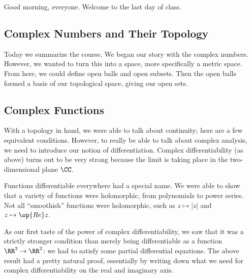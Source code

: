 
Good morning, everyone. Welcome to the last day of class.

\subsection{Complex Numbers and Their Topology}
Today we summarize the course. We began our story with the complex numbers.
\complexdefiagain*
\noindent However, we wanted to turn this into a space, more specifically a metric space.
\complexdistdefi*
\noindent From here, we could define open balls and open subsets.
\openballdefi*
\noindent Then the open balls formed a basis of our topological space, giving our open sets.
\opendefi*

\subsection{Complex Functions}
With a topology in hand, we were able to talk about continuity; here are a few equivalent conditions.
\continuitygrabbag*
\noindent However, to really be able to talk about complex analysis, we need to introduce our notion of differentiation.
\complexdiffdefi*
\noindent Complex differentiability (as above) turns out to be very strong because the limit is taking place in the two-dimensional plane $\CC$.

Functions differentiable everywhere had a special name.
\holodefi*
\noindent We were able to show that a variety of functions were holomorphic, from polynomials to power series. Not all ``smoothish'' functions were holomorphic, such as $z\mapsto|z|$ and $z\mapsto\op{Re}z$.

As our first taste of the power of complex differentiability, we saw that it was a strictly stronger condition than merely being differentiable as a function $\RR^2\to\RR^2$: we had to satisfy some partial differential equations.
\cauchyriemannnecessary*
\noindent The above result had a pretty natural proof, essentially by writing down what we need for complex differentiability on the real and imaginary axis.

